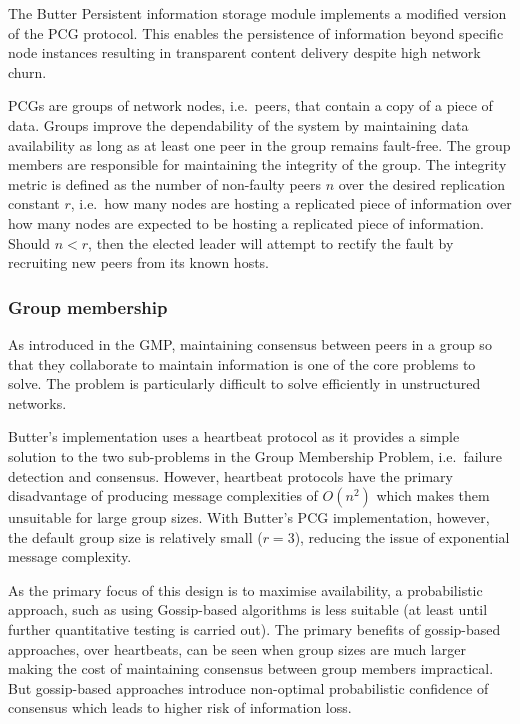 The Butter Persistent information storage module implements a modified version of the PCG protocol\cite{duarte2014reliable}. This enables the persistence of information beyond specific node instances resulting in transparent content delivery despite high network churn\cite{baldoni2005churn}.

PCGs are groups of network nodes, i.e.\ peers, that contain a copy of a piece of data. Groups improve the dependability of the system by maintaining data availability as long as at least one peer in the group remains fault-free. The group members are responsible for maintaining the integrity of the group. The integrity metric is defined as the number of non-faulty peers $n$ over the desired replication constant $r$, i.e.\ how many nodes are hosting a replicated piece of information over how many nodes are expected to be hosting a replicated piece of information. Should $n < r$, then the elected leader will attempt to rectify the fault by recruiting new peers from its known hosts.\cite{shinebourne2022availability}

\subsubsection{Group membership}

As introduced in the GMP, maintaining consensus between peers in a group so that they collaborate to maintain information is one of the core problems to solve. The problem is particularly difficult to solve efficiently in unstructured networks.

Butter's implementation uses a heartbeat protocol as it provides a simple solution to the two sub-problems in the Group Membership Problem, i.e.\ failure detection and consensus. However, heartbeat protocols have the primary disadvantage of producing message complexities of $O(n^2)$ which makes them unsuitable for large group sizes. With Butter's PCG implementation, however, the default group size is relatively small ($r=3$), reducing the issue of exponential message complexity.

As the primary focus of this design is to maximise availability, a probabilistic approach, such as using Gossip-based algorithms is less suitable (at least until further quantitative testing is carried out). The primary benefits of gossip-based approaches, over heartbeats, can be seen when group sizes are much larger making the cost of maintaining consensus between group members impractical. But gossip-based approaches introduce non-optimal probabilistic confidence of consensus which leads to higher risk of information loss.

